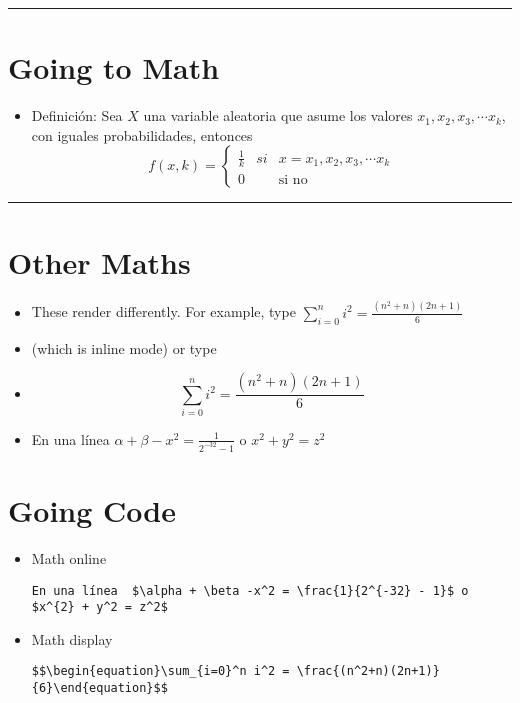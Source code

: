 \begin{center}\rule{3in}{0.4pt}\end{center}

\section{Going to Math}\label{going-to-math}

\begin{itemize}
\itemsep1pt\parskip0pt
\item
  Definición: Sea $X$ una variable aleatoria que asume los valores
  $x_{1},x_{2},x_{3},\cdots x_{k}$, con iguales probabilidades, entonces
  \begin{equation} f\left(x,k\right)=\left\{ \begin{array}{ccc}\frac{1}{k} & si & x=x_{1},x_{2},x_{3},\cdots x_{k}\\ 0 &  & \text{si no} \end{array}\right.\end{equation} 
\end{itemize}

\begin{center}\rule{3in}{0.4pt}\end{center}

\section{Other Maths}\label{other-maths}

\begin{itemize}
\item
  These render differently. For example, type
  $\sum_{i=0}^n i^2 = \frac{(n^2+n)(2n+1)}{6}$
\item
  (which is inline mode) or type
\item
 \begin{equation}
 \sum_{i=0}^n i^2 = \frac{(n^2+n)(2n+1)}{6} 
 \end{equation}
\item
  En una línea $\alpha + \beta -x^2 = \frac{1}{2^{-32} - 1}$ o
  $x^{2} + y^2 = z^2$
\end{itemize}

\section{Going Code}\label{going-code}

\begin{itemize}
\item
  Math online

\begin{verbatim}
En una línea  $\alpha + \beta -x^2 = \frac{1}{2^{-32} - 1}$ o $x^{2} + y^2 = z^2$
\end{verbatim}
\item
  Math display

\begin{verbatim}
$$\begin{equation}\sum_{i=0}^n i^2 = \frac{(n^2+n)(2n+1)}{6}\end{equation}$$
\end{verbatim}
\end{itemize}

